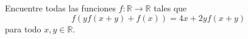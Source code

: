 Encuentre todas las funciones $f:\mathbb{R}\to\mathbb{R}$ tales que \[f\left( {yf(x + y) + f(x)} \right) = 4x + 2yf(x + y)\] para todo $x,y\in\mathbb{R}$.